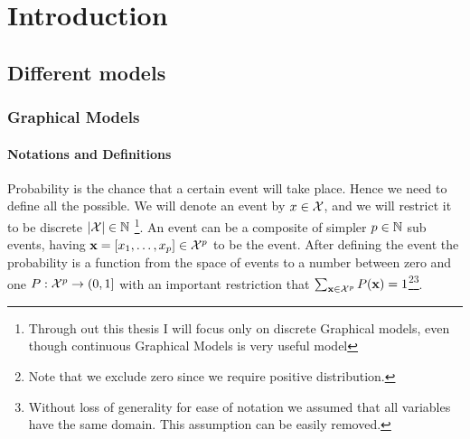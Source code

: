 
\chapter{Introduction} %

\label{intro} %


\newcommand{\keyword}[1]{\textbf{#1}}
\newcommand{\tabhead}[1]{\textbf{#1}}
\newcommand{\code}[1]{\texttt{#1}}
\newcommand{\file}[1]{\texttt{\bfseries#1}}
\newcommand{\option}[1]{\texttt{\itshape#1}}

\section{Different models}
\subsection{Graphical Models}
\subsubsection{Notations and Definitions}
Probability is the chance that a certain event will take place.
Hence we need to define all the possible.
We will denote an event by $x \in {\cal X}$, and we will restrict it to be discrete $ |{\cal X}| \in \mathbb{N}$
\footnote{Through out this thesis I will focus only on discrete Graphical models, even though continuous Graphical Models is very useful model}.
An event can be a composite of simpler $p \in \mathbb{N}$ sub events, having ${\bf x} = [x_1, \ldots, x_{p}] \in {\cal X}^p$ to be the event.
After defining the event the probability is  a function from the space of events to a number between zero and one $P:{\cal X}^{p} \to (0,1]$ with an important restriction that $\sum_{{\bf x} \in {\cal X}^{p}} P({\bf x}) = 1$\footnote{Note that we exclude zero since we require positive distribution.}\footnote{Without loss of generality for ease of notation we assumed that all variables have the same domain. This assumption can be easily removed.}.

